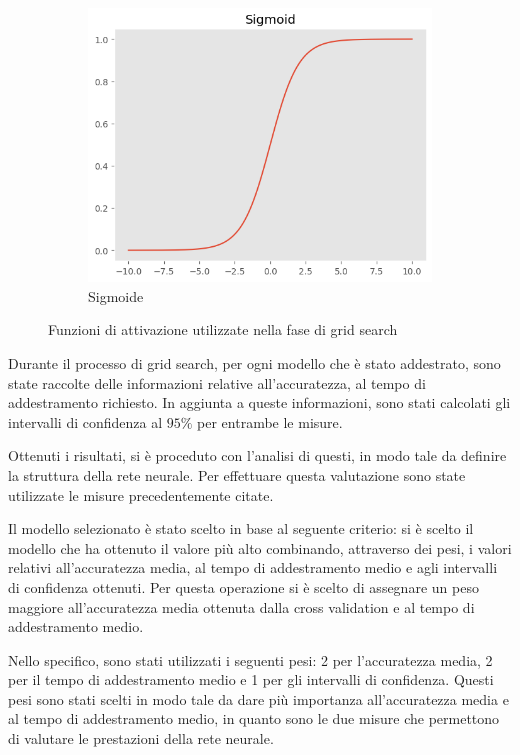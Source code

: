 \begin{figure}[!ht]
    \hfill
    \begin{subfigure}[b]{0.3\textwidth}
        \centering
        \includegraphics[width=\textwidth]{img/rete/sigmoid.png}
        \caption{Sigmoide}
        \label{fig:sigmoid}
    \end{subfigure}
    \caption{Funzioni di attivazione utilizzate nella fase di grid search}
    \label{fig:}
\end{figure}

Durante il processo di grid search, per ogni modello che è stato addestrato, sono
state raccolte delle informazioni relative all'accuratezza, al tempo di addestramento
richiesto. In aggiunta a queste informazioni, sono stati calcolati gli intervalli
di confidenza al $95\%$ per entrambe le misure.

Ottenuti i risultati, si è proceduto con l'analisi di questi, in modo tale da
definire la struttura della rete neurale. Per effettuare questa valutazione sono
state utilizzate le misure precedentemente citate.

Il modello selezionato è stato scelto in base al seguente criterio: si è scelto
il modello che ha ottenuto il valore più alto combinando, attraverso dei pesi,
i valori relativi all'accuratezza media, al tempo di addestramento medio e
agli intervalli di confidenza ottenuti. Per questa operazione si è scelto di
assegnare un peso maggiore all'accuratezza media ottenuta dalla cross validation
e al tempo di addestramento medio.

Nello specifico, sono stati utilizzati i seguenti pesi: 2 per l'accuratezza
media, 2 per il tempo di addestramento medio e 1 per gli intervalli di
confidenza. Questi pesi sono stati scelti in modo tale da dare più importanza
all'accuratezza media e al tempo di addestramento medio, in quanto sono le due
misure che permettono di valutare le prestazioni della rete neurale.

